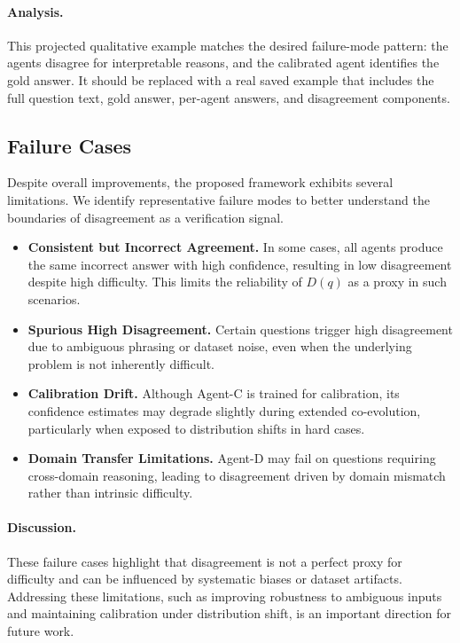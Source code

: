 \documentclass{article}
\begin{document}
\paragraph{Analysis.}
This projected qualitative example matches the desired failure-mode pattern: the agents disagree for interpretable reasons, and the calibrated agent identifies the gold answer. It should be replaced with a real saved example that includes the full question text, gold answer, per-agent answers, and disagreement components.
\subsection{Failure Cases}

Despite overall improvements, the proposed framework exhibits several limitations. We identify representative failure modes to better understand the boundaries of disagreement as a verification signal.

\begin{itemize}
    \item \textbf{Consistent but Incorrect Agreement.} In some cases, all agents produce the same incorrect answer with high confidence, resulting in low disagreement despite high difficulty. This limits the reliability of $D(q)$ as a proxy in such scenarios.

    \item \textbf{Spurious High Disagreement.} Certain questions trigger high disagreement due to ambiguous phrasing or dataset noise, even when the underlying problem is not inherently difficult.

    \item \textbf{Calibration Drift.} Although Agent-C is trained for calibration, its confidence estimates may degrade slightly during extended co-evolution, particularly when exposed to distribution shifts in hard cases.

    \item \textbf{Domain Transfer Limitations.} Agent-D may fail on questions requiring cross-domain reasoning, leading to disagreement driven by domain mismatch rather than intrinsic difficulty.
\end{itemize}

\paragraph{Discussion.}
These failure cases highlight that disagreement is not a perfect proxy for difficulty and can be influenced by systematic biases or dataset artifacts. Addressing these limitations, such as improving robustness to ambiguous inputs and maintaining calibration under distribution shift, is an important direction for future work.
\end{document}
